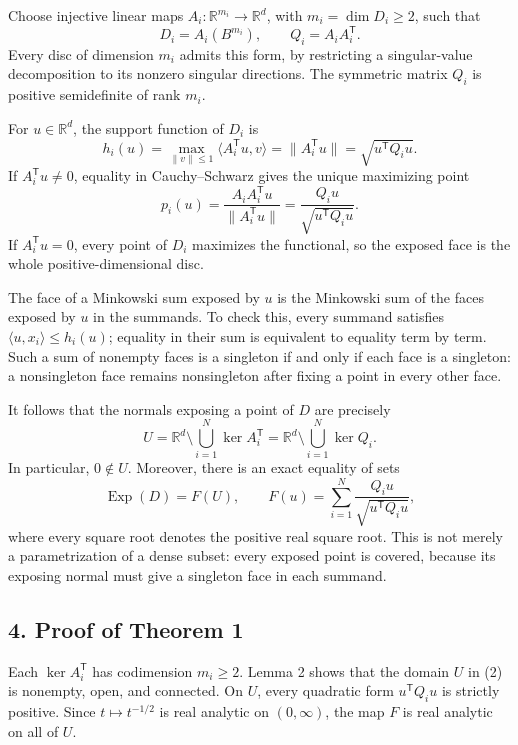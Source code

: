 \documentclass[
  11pt,
  letterpaper,
]{article}
\begin{document}
Choose injective linear maps \(A_i:\mathbb R^{m_i}\to\mathbb R^d\), with
\(m_i=\dim D_i\geq2\), such that \[
D_i=A_i(B^{m_i}),\qquad Q_i=A_iA_i^{\mathsf T}.
\] Every disc of dimension \(m_i\) admits this form, by restricting a
singular-value decomposition to its nonzero singular directions. The
symmetric matrix \(Q_i\) is positive semidefinite of rank \(m_i\).

For \(u\in\mathbb R^d\), the support function of \(D_i\) is \[
h_i(u)=\max_{\|v\|\leq1}\langle A_i^{\mathsf T}u,v\rangle
      =\|A_i^{\mathsf T}u\|
      =\sqrt{u^{\mathsf T}Q_i u}.
\] If \(A_i^{\mathsf T}u\ne0\), equality in Cauchy--Schwarz gives the
unique maximizing point \[
p_i(u)=\frac{A_iA_i^{\mathsf T}u}{\|A_i^{\mathsf T}u\|}
      =\frac{Q_i u}{\sqrt{u^{\mathsf T}Q_i u}}. \tag{1}
\] If \(A_i^{\mathsf T}u=0\), every point of \(D_i\) maximizes the
functional, so the exposed face is the whole positive-dimensional disc.

The face of a Minkowski sum exposed by \(u\) is the Minkowski sum of the
faces exposed by \(u\) in the summands. To check this, every summand
satisfies \(\langle u,x_i\rangle\leq h_i(u)\); equality in their sum is
equivalent to equality term by term. Such a sum of nonempty faces is a
singleton if and only if each face is a singleton: a nonsingleton face
remains nonsingleton after fixing a point in every other face.

It follows that the normals exposing a point of \(D\) are precisely \[
U=\mathbb R^d\setminus\bigcup_{i=1}^N\ker A_i^{\mathsf T}
 =\mathbb R^d\setminus\bigcup_{i=1}^N\ker Q_i.
\] In particular, \(0\notin U\). Moreover, there is an exact equality of
sets \[
\operatorname{Exp}(D)=F(U),\qquad
F(u)=\sum_{i=1}^N\frac{Q_i u}{\sqrt{u^{\mathsf T}Q_i u}}, \tag{2}
\] where every square root denotes the positive real square root. This
is not merely a parametrization of a dense subset: every exposed point
is covered, because its exposing normal must give a singleton face in
each summand.

\subsection{4. Proof of Theorem 1}\label{proof-of-theorem-1}

Each \(\ker A_i^{\mathsf T}\) has codimension \(m_i\geq2\). Lemma 2
shows that the domain \(U\) in (2) is nonempty, open, and connected. On
\(U\), every quadratic form \(u^{\mathsf T}Q_i u\) is strictly positive.
Since \(t\mapsto t^{-1/2}\) is real analytic on \((0,\infty)\), the map
\(F\) is real analytic on all of \(U\).
\end{document}
